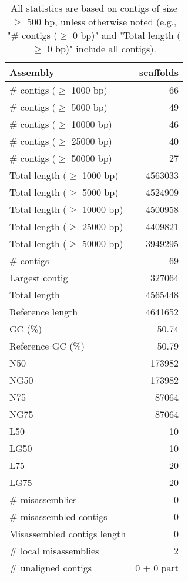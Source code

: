 \documentclass[12pt,a4paper]{article}
\begin{document}
\begin{table}[ht]
\begin{center}
\caption{All statistics are based on contigs of size $\geq$ 500 bp, unless otherwise noted (e.g., "\# contigs ($\geq$ 0 bp)" and "Total length ($\geq$ 0 bp)" include all contigs).}
\begin{tabular}{|l*{1}{|r}|}
\hline
Assembly & scaffolds \\ \hline
\# contigs ($\geq$ 1000 bp) & 66 \\ \hline
\# contigs ($\geq$ 5000 bp) & 49 \\ \hline
\# contigs ($\geq$ 10000 bp) & 46 \\ \hline
\# contigs ($\geq$ 25000 bp) & 40 \\ \hline
\# contigs ($\geq$ 50000 bp) & 27 \\ \hline
Total length ($\geq$ 1000 bp) & 4563033 \\ \hline
Total length ($\geq$ 5000 bp) & 4524909 \\ \hline
Total length ($\geq$ 10000 bp) & 4500958 \\ \hline
Total length ($\geq$ 25000 bp) & 4409821 \\ \hline
Total length ($\geq$ 50000 bp) & 3949295 \\ \hline
\# contigs & 69 \\ \hline
Largest contig & 327064 \\ \hline
Total length & 4565448 \\ \hline
Reference length & 4641652 \\ \hline
GC (\%) & 50.74 \\ \hline
Reference GC (\%) & 50.79 \\ \hline
N50 & 173982 \\ \hline
NG50 & 173982 \\ \hline
N75 & 87064 \\ \hline
NG75 & 87064 \\ \hline
L50 & 10 \\ \hline
LG50 & 10 \\ \hline
L75 & 20 \\ \hline
LG75 & 20 \\ \hline
\# misassemblies & 0 \\ \hline
\# misassembled contigs & 0 \\ \hline
Misassembled contigs length & 0 \\ \hline
\# local misassemblies & 2 \\ \hline
\# unaligned contigs & 0 + 0 part \\ \hline

\end{tabular}
\end{center}
\end{table}
\end{document}

